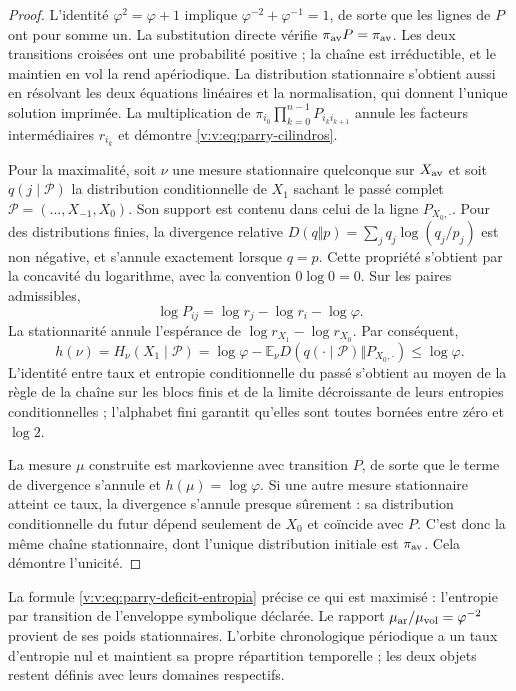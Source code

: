 \begin{proof}
L’identité \(\varphi^2=\varphi+1\) implique
\(\varphi^{-2}+\varphi^{-1}=1\), de sorte que les lignes de \(P\)
ont pour somme un. La substitution directe vérifie
\(\pi_{\rm av}P=\pi_{\rm av}\). Les deux transitions croisées
ont une probabilité positive ; la chaîne est irréductible, et le maintien
en \(\mathrm{vol}\) la rend apériodique. La distribution stationnaire
s’obtient aussi en résolvant les deux équations linéaires et la
normalisation, qui donnent l’unique solution imprimée. La multiplication de
\(\pi_{i_0}\prod_{k=0}^{n-1}P_{i_k i_{k+1}}\) annule les facteurs
intermédiaires \(r_{i_k}\) et démontre \eqref{v:v:eq:parry-cilindros}.

Pour la maximalité, soit \(\nu\) une mesure stationnaire quelconque
sur \(X_{\rm av}\) et soit
\(q(j\mid\mathcal P)\) la distribution conditionnelle de \(X_1\)
sachant le passé complet \(\mathcal P=(\ldots,X_{-1},X_0)\).
Son support est contenu dans celui de la ligne \(P_{X_0,\cdot}\).
Pour des distributions finies, la divergence relative
\(D(q\Vert p)=\sum_jq_j\log(q_j/p_j)\) est non négative, et
s’annule exactement lorsque \(q=p\). Cette propriété s’obtient par
la concavité du logarithme, avec la convention \(0\log0=0\).
Sur les paires admissibles,
\[
 \log P_{ij}=\log r_j-\log r_i-\log\varphi.
\]
La stationnarité annule l’espérance de
\(\log r_{X_1}-\log r_{X_0}\). Par conséquent,
\begin{equation}
 h(\nu)=H_\nu(X_1\mid\mathcal P)
 =\log\varphi-
 \mathbb E_\nu D\!\left(q(\cdot\mid\mathcal P)
                  \Vert P_{X_0,\cdot}\right)
 \leq\log\varphi.
 \label{v:v:eq:parry-deficit-entropia}
\end{equation}
L’identité entre taux et entropie conditionnelle du passé s’obtient
au moyen de la règle de la chaîne sur les blocs finis et de la limite
décroissante de leurs entropies conditionnelles ; l’alphabet fini garantit
qu’elles sont toutes bornées entre zéro et \(\log2\).

La mesure \(\mu\) construite est markovienne avec transition \(P\),
de sorte que le terme de divergence s’annule et
\(h(\mu)=\log\varphi\). Si une autre mesure stationnaire atteint
ce taux, la divergence s’annule presque sûrement : sa distribution
conditionnelle du futur dépend seulement de \(X_0\) et coïncide avec \(P\).
C’est donc la même chaîne stationnaire, dont l’unique distribution initiale
est \(\pi_{\rm av}\). Cela démontre l’unicité.
\end{proof}

La formule \eqref{v:v:eq:parry-deficit-entropia} précise ce qui est maximisé :
l’entropie par transition de l’enveloppe symbolique déclarée. Le rapport
\(\mu_{\rm ar}/\mu_{\rm vol}=\varphi^{-2}\) provient de ses poids
stationnaires. L’orbite chronologique périodique a un taux d’entropie
nul et maintient sa propre répartition temporelle ; les deux objets restent
définis avec leurs domaines respectifs.
